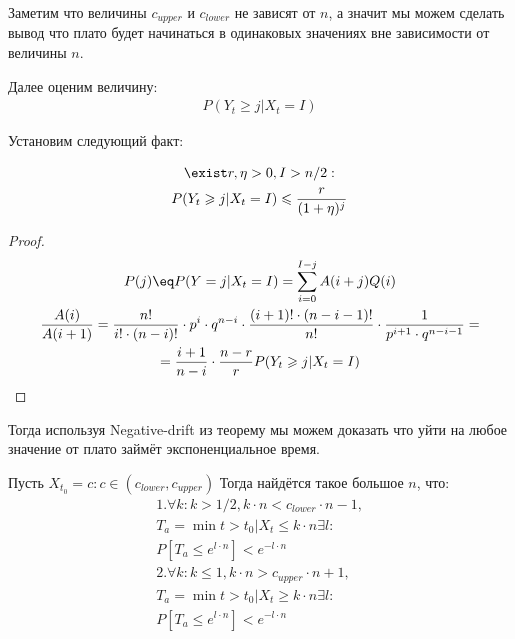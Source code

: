 \documentclass[times,specification,annotation]{itmo-student-thesis}
\begin{document}
    Заметим что величины $c_{upper}$ и $c_{lower}$ не зависят от $n$, а значит мы можем сделать вывод что плато будет начинаться в одинаковых значениях вне зависимости от величины $n$.

    Далее оценим величину:
    \begin{gather*}
        P(Y_t \geq j|X_t = I)
    \end{gather*}

    Установим следующий факт:

    \begin{theorem}
        \begin{gather*}
            \exist r, \eta > 0, I > n/2: \\
            P(Y_t \geq j|X_t = I) \leq \frac{r}{(1 + \eta)^j}
        \end{gather*}
    \end{theorem}

    \begin{proof}
        \begin{gather*}
            P(j) \eq P(Y = j|X_t = I) = \sum_{i = 0}^{I - j} A(i + j)Q(i) \\
            \frac{A(i)}{A(i + 1)} = \frac{n!}{i! \cdot (n - i)!} \cdot p^i \cdot q^{n - i} \cdot \frac{(i + 1)! \cdot (n - i - 1)!}{n!} \cdot \frac{1}{p^{i + 1} \cdot q^{n - i - 1}} = \\
            = \frac{i + 1}{n - i} \cdot \frac{n - r}{r}
            P(Y_t \geq j|X_t = I)
        \end{gather*}

    \end{proof}


    Тогда используя Negative-drift из \cite{drifts_1} теорему мы можем доказать что уйти на любое значение от плато займёт экспоненциальное время.

    \begin{theorem}
        Пусть $X_{t_0} = c: c \in (c_{lower}, c_{upper})$
        Тогда найдётся такое большое $n$, что:
        \begin{gather*}
            1. \forall k : k > 1/2, k \cdot n < c_{lower} \cdot n - 1, \\
            T_a = \min{t > t_0 | X_t \leq k \cdot n} \exists l: \\
            P[T_a \leq e^{l\cdot n}] < e^{-l\cdot n} \\
            2. \forall k : k  \leq 1, k \cdot n > c_{upper} \cdot n + 1, \\
            T_a = \min{t > t_0 | X_t \geq k \cdot n} \exists l: \\
            P[T_a \leq e^{l\cdot n}] < e^{-l\cdot n} \\
        \end{gather*}
    \end{theorem}
\end{document}
